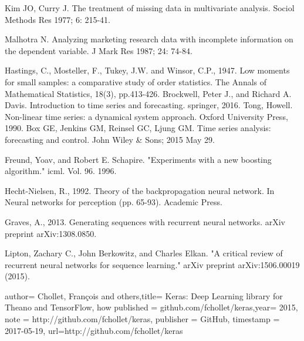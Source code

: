 \documentclass[11pt]{report}           %
\begin{document}
\begin{thebibliography}{80}
Kim JO, Curry J. The treatment of missing data in multivariate
analysis. Sociol Methods Res 1977; 6: 215-41.

 Malhotra N. Analyzing marketing research data with incomplete information on the dependent variable. J Mark Res 1987; 24: 74-84.
 
 Hastings, C., Mosteller, F., Tukey, J.W. and Winsor, C.P., 1947. Low moments for small samples: a comparative study of order statistics. The Annals of Mathematical Statistics, 18(3), pp.413-426.
 Brockwell, Peter J., and Richard A. Davis. Introduction to time series and forecasting. springer, 2016.
 Tong, Howell. Non-linear time series: a dynamical system approach. Oxford University Press, 1990.
 Box GE, Jenkins GM, Reinsel GC, Ljung GM. Time series analysis: forecasting and control. John Wiley & Sons; 2015 May 29.
 
 Freund, Yoav, and Robert E. Schapire. "Experiments with a new boosting algorithm." icml. Vol. 96. 1996.
 
 Hecht-Nielsen, R., 1992. Theory of the backpropagation neural network. In Neural networks for perception (pp. 65-93). Academic Press.
 
 Graves, A., 2013. Generating sequences with recurrent neural networks. arXiv preprint arXiv:1308.0850.
 
 Lipton, Zachary C., John Berkowitz, and Charles Elkan. "A critical review of recurrent neural networks for sequence learning." arXiv preprint arXiv:1506.00019 (2015).
 
  author= {Chollet, Fran\c{c}ois and others},title= {Keras: Deep Learning library for {T}heano and {T}ensorFlow}, how published = {github.com/fchollet/keras},year= {2015}, note = {http://github.com/fchollet/keras},
  publisher    = {GitHub}, timestamp    = {2017-05-19}, url={http://github.com/fchollet/keras}
  
  \bibitem{}
  
\end{thebibliography}
\end{document}

